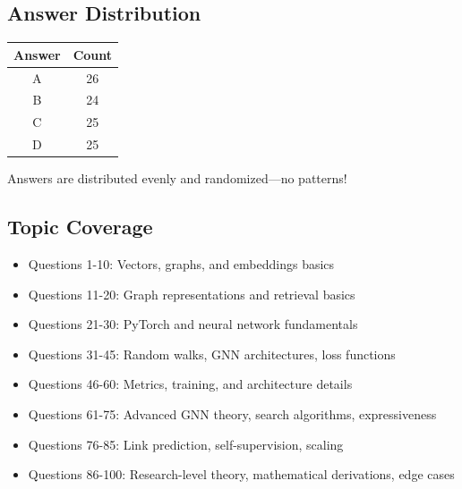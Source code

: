 \documentclass[12pt,a4paper]{article}
\begin{document}
\subsection*{Answer Distribution}
\begin{tabular}{|c|c|}
\hline
\textbf{Answer} & \textbf{Count} \\
\hline
A & 26 \\
B & 24 \\
C & 25 \\
D & 25 \\
\hline
\end{tabular}

\vspace{0.5cm}
Answers are distributed evenly and randomized---no patterns!

\subsection*{Topic Coverage}
\begin{itemize}
    \item Questions 1-10: Vectors, graphs, and embeddings basics
    \item Questions 11-20: Graph representations and retrieval basics
    \item Questions 21-30: PyTorch and neural network fundamentals
    \item Questions 31-45: Random walks, GNN architectures, loss functions
    \item Questions 46-60: Metrics, training, and architecture details
    \item Questions 61-75: Advanced GNN theory, search algorithms, expressiveness
    \item Questions 76-85: Link prediction, self-supervision, scaling
    \item Questions 86-100: Research-level theory, mathematical derivations, edge cases
\end{itemize}
\end{document}
